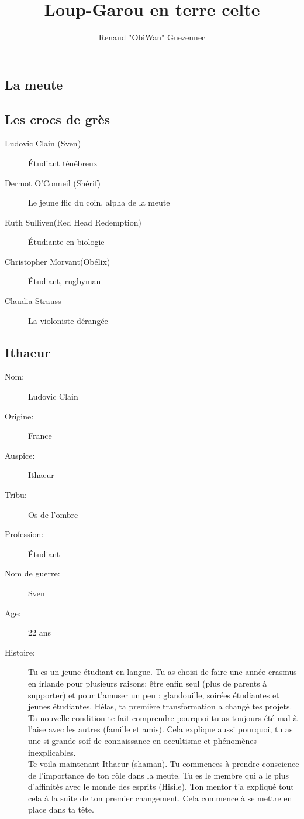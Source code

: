 \documentclass[oneside,12pt]{book}
\title{Loup-Garou en terre celte}
\author{Renaud "ObiWan" Guezennec}
\date{}
\begin{document}
\maketitle \clearpage
\tableofcontents \clearpage

\begin{flushleft}
         
\chapter{La meute}
\section{Les crocs de grès }
\begin{description}
\item[Ludovic Clain (Sven)]{ Étudiant ténébreux }
\item[Dermot O'Conneil (Shérif)]{Le jeune flic du coin, alpha de la meute }
\item[Ruth Sulliven(Red Head Redemption)]{Étudiante en biologie }
\item[Christopher Morvant(Obélix)]{ Étudiant, rugbyman }
\item[Claudia Strauss ]{ La violoniste dérangée }
\end{description}



\clearpage
\section{Ithaeur}
\begin{description}
\item[Nom:]{Ludovic Clain}
\item[Origine:]{France}
\item[Auspice:]{Ithaeur}
\item[Tribu:]{Os de l'ombre}
\item[Profession:]{Étudiant}
\item[Nom de guerre:]{Sven}
\item[Age:]{22 ans}
\item[Histoire:]{ 
Tu es un jeune étudiant en langue. Tu as choisi de faire une année erasmus en irlande pour plusieurs raisons: être enfin seul (plus de parents à supporter) et pour t'amuser un peu : glandouille, soirées étudiantes et jeunes étudiantes. Hélas, ta première transformation a changé tes projets. Ta nouvelle condition te fait comprendre pourquoi tu as toujours été mal à l'aise avec les autres (famille et amis). Cela explique aussi pourquoi, tu as une si grande soif de connaissance en occultisme et phénomènes inexplicables.\\
Te voila maintenant Ithaeur (shaman). Tu commences à prendre conscience de l'importance de ton rôle dans la meute. Tu es le membre qui a le plus d'affinités avec le monde des esprits (Hisile). Ton mentor t'a expliqué tout cela à la suite de ton premier changement. Cela commence à se mettre en place dans ta tête.\\

}
\end{description}
\end{flushleft}
\end{document}
